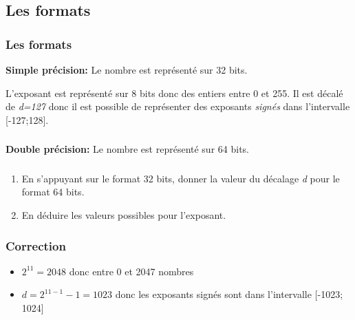 \documentclass[svgnames,11pt]{beamer}
\begin{document}
\subsection{Les formats}
\begin{frame}
    \frametitle{Les formats}

    \textbf{Simple précision:} Le nombre est représenté sur 32 bits.
    \begin{center}
    \end{center}
    L'exposant est représenté sur 8 bits donc des entiers entre 0 et 255. Il est décalé de \emph{d=127} donc il est possible de représenter des exposants \emph{signés} dans l'intervalle [-127;128].
\end{frame}
\begin{frame}
    \frametitle{}

    \textbf{Double précision:} Le nombre est représenté sur 64 bits.
    \begin{center}
    \end{center}

\end{frame}
\begin{frame}
    \frametitle{}

    \begin{activite}
        \begin{enumerate}
            \item En s'appuyant sur le format 32 bits, donner la valeur du décalage \emph{d} pour le format 64 bits.
            \item En déduire les valeurs possibles pour l'exposant.
        \end{enumerate}
    \end{activite}

\end{frame}
\begin{frame}
    \frametitle{Correction}
\begin{itemize}
    \item $2^{11} = 2048$ donc entre 0 et 2047 nombres
    \item $d = 2^{11-1}-1=1023$ donc les exposants signés sont dans l'intervalle [-1023; 1024]
\end{itemize}
\end{frame}
\end{document}
